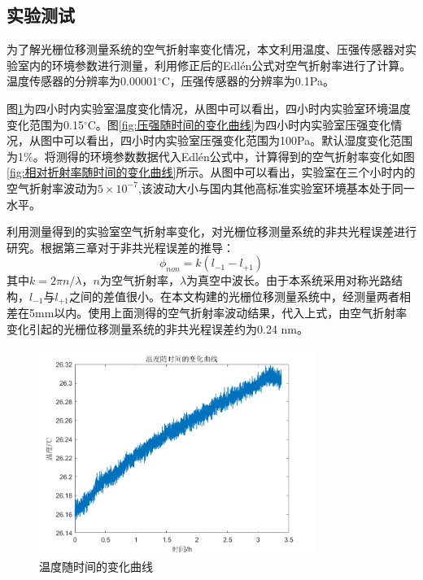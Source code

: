 \documentclass[type=master,oneside]{fduthesis}
\begin{document}
\subsection{实验测试}
为了解光栅位移测量系统的空气折射率变化情况，本文利用温度、压强传感器对实验室内的环境参数进行测量，利用修正后的Edlén公式对空气折射率进行了计算。温度传感器的分辨率为0.00001${ }^{\circ} \mathrm{C}$，压强传感器的分辨率为0.1Pa。

图\ref{fig:温度随时间的变化曲线}为四小时内实验室温度变化情况，从图中可以看出，四小时内实验室环境温度变化范围为0.15${ }^{\circ} \mathrm{C}$。图\ref{fig:压强随时间的变化曲线}为四小时内实验室压强变化情况，从图中可以看出，四小时内实验室压强变化范围为100Pa。默认湿度变化范围为1\%。将测得的环境参数数据代入Edlén公式中，计算得到的空气折射率变化如图\ref{fig:相对折射率随时间的变化曲线}所示。从图中可以看出，实验室在三个小时内的空气折射率波动为$5\times 10^{-7}$,该波动大小与国内其他高标准实验室环境\cite{yan2014measurement}基本处于同一水平。

利用测量得到的实验室空气折射率变化，对光栅位移测量系统的非共光程误差进行研究。根据第三章对于非共光程误差的推导：
\begin{equation}
  \phi_{n o n}=k\left(l_{-1}-l_{+1}\right)
\end{equation}
其中$k=2 \pi n / \lambda$，$n$为空气折射率，$\lambda $为真空中波长。由于本系统采用对称光路结构，$l_{-1}$与$l_{+1}$之间的差值很小。在本文构建的光栅位移测量系统中，经测量两者相差在5mm以内。使用上面测得的空气折射率波动结果，代入上式，由空气折射率变化引起的光栅位移测量系统的非共光程误差约为0.24 nm。

\begin{figure}[htb]
  \centering
  \includegraphics[width=0.8\textwidth]{4-fig//温度随时间的变化曲线.png}
  \caption{温度随时间的变化曲线}
  \label{fig:温度随时间的变化曲线}
\end{figure}
\end{document}
